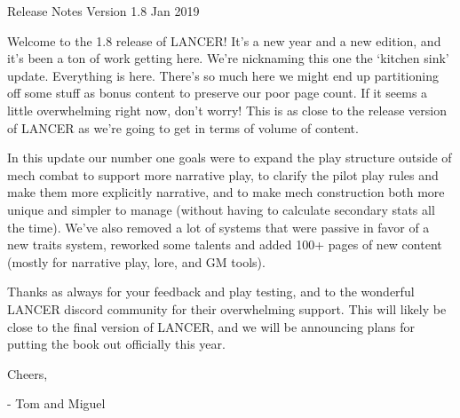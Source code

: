 Release Notes
Version 1.8
Jan 2019

Welcome to the 1.8 release of LANCER! It’s a new year and a new edition, and it’s been a ton of
work getting here. We’re nicknaming this one the ‘kitchen sink’ update. Everything is here. There’s
so much here we might end up partitioning off some stuff as bonus content to preserve our poor
page count. If it seems a little overwhelming right now, don’t worry! This is as close to the release
version of LANCER as we’re going to get in terms of volume of content.

In this update our number one goals were to expand the play structure outside of mech combat to
support more narrative play, to clarify the pilot play rules and make them more explicitly narrative,
and to make mech construction both more unique and simpler to manage (without having to
calculate secondary stats all the time). We’ve also removed a lot of systems that were passive in
favor of a new traits system, reworked some talents and added 100+ pages of new content
(mostly for narrative play, lore, and GM tools).

Thanks as always for your feedback and play testing, and to the wonderful LANCER discord
community for their overwhelming support. This will likely be close to the final version of LANCER,
and we will be announcing plans for putting the book out officially this year.

Cheers,

- Tom and Miguel








